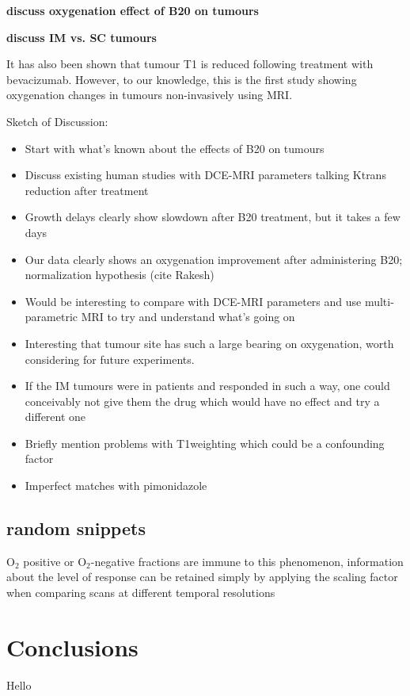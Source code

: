 \textbf{discuss oxygenation effect of B20 on tumours}


\textbf{discuss IM vs. SC tumours}


\textbf{}





It has also been shown that tumour T1 is reduced following treatment with bevacizumab. 
However, to our knowledge, this is the first study showing oxygenation changes in tumours non-invasively using MRI. 


Sketch of Discussion:

\begin{itemize}
    \item Start with what's known about the effects of B20 on tumours
    \item Discuss existing human studies with DCE-MRI parameters talking Ktrans reduction after treatment
    \item Growth delays clearly show slowdown after B20 treatment, but it takes a few days
    \item Our data clearly shows an oxygenation improvement after administering B20; normalization hypothesis (cite Rakesh)
    \item Would be interesting to compare with DCE-MRI parameters and use multi-parametric MRI to try and understand what's going on 
    \item Interesting that tumour site has such a large bearing on oxygenation, worth considering for future experiments. 
    \item If the IM tumours were in patients and responded in such a way, one could conceivably not give them the drug which would have no effect and try a different one
    \item Briefly mention problems with T1weighting which could be a confounding factor
    \item Imperfect matches with pimonidazole
\end{itemize}

\subsection{random snippets}
O$_2$ positive or O$_2$-negative fractions are immune to this phenomenon, information about the level of response can be retained simply by applying the scaling factor when comparing scans at different temporal resolutions


\section{Conclusions}
Hello


